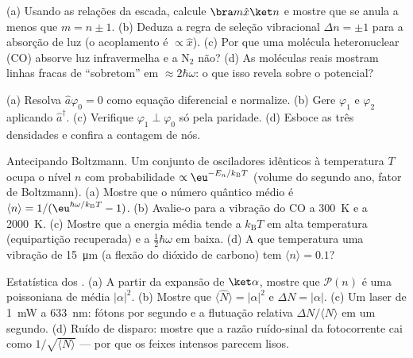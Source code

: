 \begin{exercise}[$\star$]\label{exo:b3:harmonic-oscillator:4}
(a) Usando as relações da escada, calcule $\bra m\hat x\ket n$ e
mostre que se anula a menos que $m = n \pm 1$. (b) Deduza a regra de
seleção vibracional $\Delta n = \pm1$ para a absorção de luz (o
acoplamento é $\propto\hat x$). (c) Por que uma molécula heteronuclear
(CO) absorve luz infravermelha e a N$_2$ não? (d) As moléculas reais
mostram linhas fracas de ``sobretom'' em $\approx 2\hbar\omega$: o que
isso revela sobre o potencial?
\end{exercise}

\begin{exercise}[$\star\star$]\label{exo:b3:harmonic-oscillator:5}
(a) Resolva $\hat a\varphi_0 = 0$ como equação diferencial e
normalize. (b) Gere $\varphi_1$ e $\varphi_2$ aplicando
$\hat a^\dagger$. (c) Verifique $\varphi_1 \perp \varphi_0$ só pela
paridade. (d) Esboce as três densidades e confira a contagem de nós.
\end{exercise}

\begin{exercise}[$\star\star$]\label{exo:b3:harmonic-oscillator:6}
Antecipando Boltzmann. Um conjunto de osciladores idênticos à
temperatura $T$ ocupa o nível $n$ com probabilidade $\propto
\eu^{-E_n/k_{\text{B}}T}$ (volume do segundo ano, fator de Boltzmann).
(a) Mostre que o número quântico médio é $\langle n\rangle =
1/(\eu^{\hbar\omega/k_{\text{B}}T} - 1)$. (b) Avalie-o para a vibração
do CO a \qty{300}{K} e a \qty{2000}{K}. (c) Mostre que a energia média
tende a $k_{\text{B}}T$ em alta temperatura (equipartição recuperada) e
a $\tfrac12\hbar\omega$ em baixa. (d) A que temperatura uma vibração de
\qty{15}{\micro m} (a flexão do dióxido de carbono) tem
$\langle n\rangle = 0.1$?
\end{exercise}

\begin{exercise}[$\star\star$]\label{exo:b3:harmonic-oscillator:7}
Estatística dos . (a) A partir da expansão de
$\ket\alpha$, mostre que $\mathcal P(n)$ é uma poissoniana de média
$|\alpha|^2$. (b) Mostre que $\langle\hat N\rangle = |\alpha|^2$ e
$\Delta N = |\alpha|$. (c) Um laser de \qty{1}{mW} a \qty{633}{nm}:
fótons por segundo e a flutuação relativa $\Delta N/\langle N\rangle$
em um segundo. (d) Ruído de disparo: mostre que a razão ruído-sinal da
fotocorrente cai como $1/\sqrt{\langle N\rangle}$ --- por que os feixes
intensos parecem lisos.
\end{exercise}

